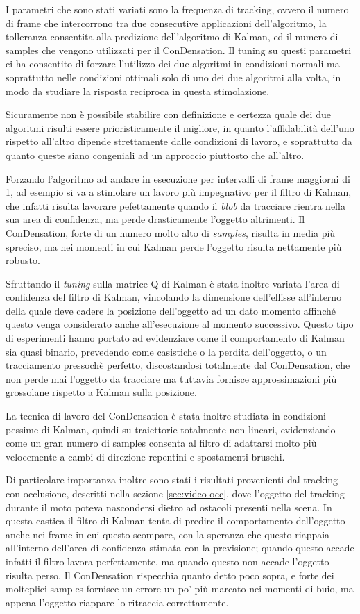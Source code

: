 I parametri che sono stati variati sono la frequenza di tracking, ovvero il numero di frame che intercorrono tra due consecutive applicazioni dell'algoritmo, la tolleranza consentita alla predizione dell'algoritmo di Kalman, ed il numero di samples che vengono utilizzati per il ConDensation. Il tuning su questi parametri ci ha consentito di forzare l'utilizzo dei due algoritmi in condizioni normali ma soprattutto nelle condizioni ottimali solo di uno dei due algoritmi alla volta, in modo da studiare la risposta reciproca in questa stimolazione.

Sicuramente non è possibile stabilire con definizione e certezza quale dei due algoritmi risulti essere prioristicamente il migliore, in quanto l'affidabilità dell'uno rispetto all'altro dipende strettamente dalle condizioni di lavoro, e soprattutto da quanto queste siano congeniali ad un approccio piuttosto che all'altro.

Forzando l'algoritmo ad andare in esecuzione per intervalli di frame maggiorni di 1, ad esempio si va a stimolare un lavoro più impegnativo per il filtro di Kalman, che infatti risulta lavorare pefettamente quando il \textit{blob} da tracciare rientra nella sua area di confidenza, ma perde drasticamente l'oggetto altrimenti. Il ConDensation, forte di un numero molto alto di \textit{samples}, risulta in media più spreciso, ma nei momenti in cui Kalman perde l'oggetto risulta nettamente più robusto.

Sfruttando il \textit{tuning} sulla matrice Q di Kalman è stata inoltre variata l'area di confidenza del filtro di Kalman, vincolando la dimensione dell'ellisse all'interno della quale deve cadere la posizione dell'oggetto ad un dato momento affinché questo venga considerato anche all'esecuzione al momento successivo. Questo tipo di esperimenti hanno portato ad evidenziare come il comportamento di Kalman sia quasi binario, prevedendo come casistiche o la perdita dell'oggetto, o un tracciamento pressochè perfetto, discostandosi totalmente dal ConDensation, che non perde mai l'oggetto da tracciare ma tuttavia fornisce approssimazioni più grossolane rispetto a Kalman sulla posizione.

La tecnica di lavoro del ConDensation è stata inoltre studiata in condizioni pessime di Kalman, quindi su traiettorie totalmente non lineari, evidenziando come un gran numero di samples consenta al filtro di adattarsi molto più velocemente a cambi di direzione repentini e spostamenti bruschi.

Di particolare importanza inoltre sono stati i risultati provenienti dal tracking con occlusione, descritti nella sezione \ref{sec:video-occ}, dove l'oggetto del tracking durante il moto poteva nascondersi dietro ad ostacoli presenti nella scena. In questa castica il filtro di Kalman tenta di predire il comportamento dell'oggetto anche nei frame in cui questo scompare, con la speranza che questo riappaia all'interno dell'area di confidenza stimata con la previsione; quando questo accade infatti il filtro lavora perfettamente, ma quando questo non accade l'oggetto risulta perso. Il ConDensation rispecchia quanto detto poco sopra, e forte dei molteplici samples fornisce un errore un po' più marcato nei momenti di buio, ma appena l'oggetto riappare lo ritraccia correttamente.

